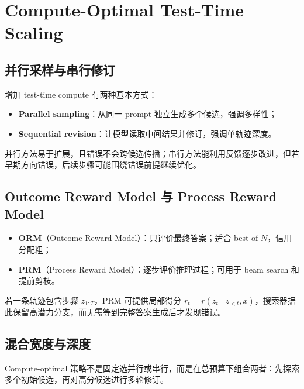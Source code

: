 \documentclass[a4paper]{article}
\begin{document}
\section{Compute-Optimal Test-Time Scaling}

\subsection{并行采样与串行修订}

增加 test-time compute 有两种基本方式：

\begin{itemize}
    \item \textbf{Parallel sampling}：从同一 prompt 独立生成多个候选，强调多样性；
    \item \textbf{Sequential revision}：让模型读取中间结果并修订，强调单轨迹深度。
\end{itemize}


并行方法易于扩展，且错误不会跨候选传播；串行方法能利用反馈逐步改进，但若早期方向错误，后续步骤可能围绕错误前提继续优化。

\subsection{Outcome Reward Model 与 Process Reward Model}


\begin{itemize}
    \item \textbf{ORM}（Outcome Reward Model）：只评价最终答案；适合 best-of-$N$，信用分配粗；
    \item \textbf{PRM}（Process Reward Model）：逐步评价推理过程；可用于 beam search 和提前剪枝。
\end{itemize}

若一条轨迹包含步骤 $z_{1:T}$，PRM 可提供局部得分 $r_t=r(z_t\mid z_{<t},x)$，搜索器据此保留高潜力分支，而无需等到完整答案生成后才发现错误。

\subsection{混合宽度与深度}

Compute-optimal 策略不是固定选并行或串行，而是在总预算下组合两者：先探索多个初始候选，再对高分候选进行多轮修订。
\end{document}
